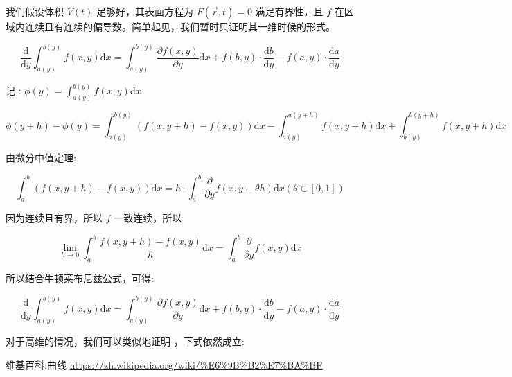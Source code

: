\documentclass[fontset=windows]{article}
\newcommand{\upcite}[1]{\textsuperscript{\cite{#1}}}
\begin{document}
我们假设体积 $V(t)$ 足够好，其表面方程为 $ F(\vec{r},t) = 0 $ 满足有界性，且 $f$ 在区域内连续且有连续的偏导数。简单起见，我们暂时只证明其一维时候的形式。

$$
\frac{\mathrm{d}}{\mathrm{d}y} \int_{a(y)}^{b(y)}f(x,y) \mathrm{d}x = 
\int_{a(y)}^{b(y)}\frac{\partial f(x,y)}{\partial y} \mathrm{d}x
+ f(b,y) \cdot \frac{\mathrm{d}b}{\mathrm{d}y}
- f(a,y) \cdot \frac{\mathrm{d}a}{\mathrm{d}y}
$$

记 : $ \phi(y) = \int_{a(y)}^{b(y)}f(x,y) \mathrm{d}x $

$$
\phi(y + h) - \phi(y) = \int_{a(y)}^{b(y)}(f(x,y + h) - f(x,y))\mathrm{d}x
                        - \int_{a(y)}^{a(y + h)}f(x,y + h)\mathrm{d}x
                        + \int_{b(y)}^{b(y + h)}f(x,y + h)\mathrm{d}x
$$

由微分中值定理:

$$
\int_{a}^{b}(f(x,y + h) - f(x,y))\mathrm{d}x 
    = h \cdot \int_{a}^{b} \frac{\partial}{\partial y}f(x,y + \theta h) \mathrm{d}x (\theta \in [0,1])
$$

因为连续且有界，所以 $f$ 一致连续，所以

$$
\lim_{h \rightarrow 0} \int_{a}^{b}\frac{f(x,y + h) - f(x,y)}{h}\mathrm{d}x 
    = \int_{a}^{b} \frac{\partial}{\partial y}f(x,y) \mathrm{d}x
$$

所以结合牛顿莱布尼兹公式，可得:

$$
\frac{\mathrm{d}}{\mathrm{d}y} \int_{a(y)}^{b(y)}f(x,y) \mathrm{d}x = 
\int_{a(y)}^{b(y)}\frac{\partial f(x,y)}{\partial y} \mathrm{d}x
+ f(b,y) \cdot \frac{\mathrm{d}b}{\mathrm{d}y}
- f(a,y) \cdot \frac{\mathrm{d}a}{\mathrm{d}y}
$$

对于高维的情况，我们可以类似地证明 \upcite{ref1} ，下式依然成立:



\begin{thebibliography}{30}

     维基百科:曲线 \url{https://zh.wikipedia.org/wiki/%E6%9B%B2%E7%BA%BF}

\end{thebibliography}
\end{document}

